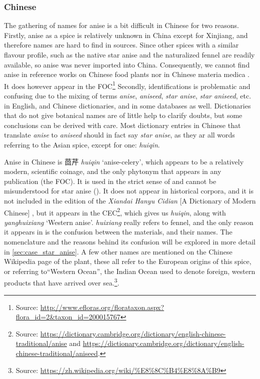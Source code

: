 \subsubsection{Chinese}



The gathering of names for anise is a bit difficult in Chinese for two reasons. Firstly, anise as a spice is relatively unknown in China except for Xinjiang, and therefore names are hard to find in sources. Since other spices with a similar flavour profile, such as the native star anise and the naturalized fennel are readily available, so anise was never imported into China. Consequently, we cannot find anise in reference works on Chinese food plants nor in Chinese \gls{materia medica} \autocite[see][]{hu_enumeration_1999, hu_food_2005}. It does however appear in the \gls{FOC}\footnote{Source: \url{http://www.efloras.org/florataxon.aspx?flora_id=2&taxon_id=200015767}} Secondly, identifications is problematic and confusing due to the mixing of terms \textit{anise}, \textit{aniseed}, \textit{star anise}, \textit{star aniseed}, etc. in English, and Chinese dictionaries, and in some databases as well. Dictionaries that do not give botanical names are of little help to clarify doubts, but some conclusions can be derived with care. Most dictionary entries in Chinese that translate \textit{anise} to \textit{aniseed} should in fact say \textit{star anise}, as they ar all words referring to the Asian spice, except for one:  \textit{huiqin}.

Anise in Chinese is 茴芹 \textit{huiqin} `anise-celery', which appears to be a relatively modern, scientific coinage, and the only \gls{phytonym} that appears in any publication (the \gls{FOC}). It is used in the strict sense of  and cannot be misunderstood for star anise (). It does not appear in historical corpora, and it is not included in the  edition of the \textit{Xiandai Hanyu Cidian} [A Dictionary of Modern Chinese] \autocite[]{chinese_academy_of_social_sciences_xiandai_2016}, but it appears in the \gls{CEC}\footnote{Source: \url{https://dictionary.cambridge.org/dictionary/english-chinese-traditional/anise} and \url{https://dictionary.cambridge.org/dictionary/english-chinese-traditional/aniseed}.}, which gives us \textit{huiqin}, along with  \textit{yanghuixiang} `Western anise'.  \textit{huixiang} really refers to fennel, and the only reason it appears in \textcite{kleeman_oxford_2010} is the confusion between the materials, and their names. The nomenclature and the reasons behind its confusion will be explored in more detail in \cref{sec:case_star_anise}. A few other names are mentioned on the Chinese Wikipedia page of the plant, these all refer to the European origins of this spice, or referring to``Western Ocean'', the Indian Ocean used to denote foreign, western products that have arrived over sea.\footnote{Source: \url{https://zh.wikipedia.org/wiki/\%E8\%8C\%B4\%E8\%8A\%B9}}. 

